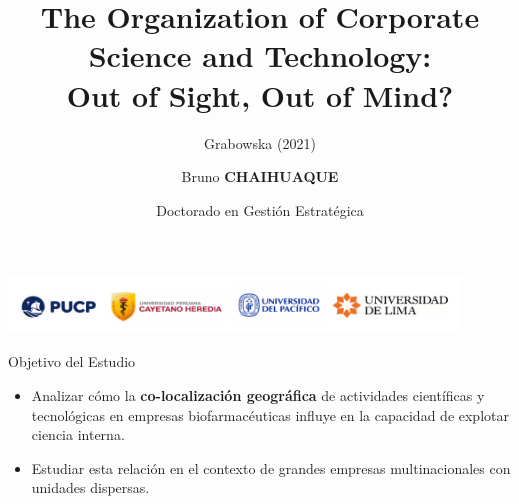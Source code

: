 \documentclass{beamer}
\title[Co-localización Ciencia y Tecnología]{The Organization of Corporate Science and Technology:\\ Out of Sight, Out of Mind?}
\subtitle{Grabowska (2021)}
\author{Bruno \textbf{CHAIHUAQUE}}
\date{Doctorado en Gestión Estratégica}
\begin{document}
	
	\begin{frame}
		\centering
		\titlepage
		\vspace{1cm}
		\includegraphics[width=0.9\textwidth]{./figs/Logos.pdf}
	\end{frame}
	
	\begin{frame}{Objetivo del Estudio}
		\begin{itemize}
			\item Analizar cómo la \textbf{co-localización geográfica} de actividades científicas y tecnológicas en empresas biofarmacéuticas influye en la capacidad de explotar ciencia interna.
			\item Estudiar esta relación en el contexto de grandes empresas multinacionales con unidades dispersas.
		\end{itemize}
	\end{frame}
	
\end{document}
